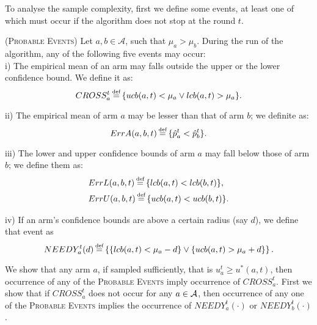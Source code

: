 To analyse the sample complexity, first we define some events, at least
one of which must occur if the algorithm does not stop at the round $t$.

\begin{definition}{(\textsc{Probable Events})}
Let $a, b \in \mathcal{A}$, such that $\mu_a > \mu_b$. During the
run of the algorithm, any of the following five events may occur:\\
i) The empirical mean of an arm may falls outside the upper or the lower
confidence bound. We define it as:
$$CROSS_a^t \defeq \{ucb(a,t) < \mu_a \vee lcb(a,t) > \mu_a\}.$$

ii) The empirical mean of arm $a$ may be lesser than that of arm $b$; we definite as:
$$ErrA(a,b,t) \defeq \{\hatp_a^t < \hatp_b^t\}.$$

iii) The lower and upper confidence bounds of arm $a$ may fall below those of arm $b$; we
define them as:
\begin{align*}
 & ErrL(a,b,t) \defeq \{lcb(a,t) < lcb(b,t)\},\\
 & ErrU(a,b,t) \defeq \{ucb(a,t) < ucb(b,t)\}.
\end{align*}

iv) If an arm's confidence bounds are above a certain radius (say $d$), we define that event as
\begin{equation*}
 NEEDY_a^t(d) \defeq \left\{\{lcb(a,t) < \mu_a -d\} \vee \{ucb(a,t) > \mu_a +d\}\right\}.
\end{equation*}
\end{definition}

We show that any arm $a$, if sampled sufficiently, that is $u_a^t \geq u^*(a,t)$, 
then occurrence of any of the \textsc{Probable Events} imply occurrence of $CROSS_a^t$.
First we show that if  $CROSS_a^t$ does not occur for any $a \in \mathcal{A}$, then occurrence
of any one of the \textsc{Probable Events} implies the occurrence of $NEEDY_a^t(\cdot)$
or $NEEDY_b^t(\cdot)$.


